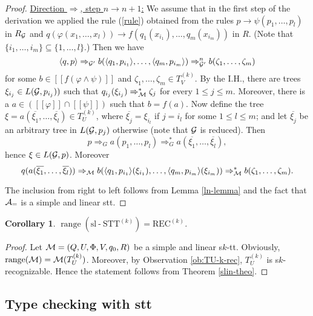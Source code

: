 \documentclass[10pt]{scrartcl}
\newtheorem{cor}[df]{Corollary}
\newcommand{\seml}{[\![}
\newcommand{\semr}{]\!]}
\newcommand{\REC}{\mathrm{REC}}
\newcommand{\slSTT}{\mathrm{sl}\n\mathrm{STT}}
\newcommand{\A}{{\cal A}}
\newcommand{\M}{{\cal M}}
\newcommand{\G}{{\cal G}}
\DeclareMathOperator{\range}{range}
\DeclareMathOperator{\n}{-}
\def\ui#1{^{(#1)}}
\begin{document}
\begin{proof}
\underline{Direction $\Rightarrow$, step $n\to n+1$:} We assume that in the first step of the derivation we applied the rule (\ref{rule}) obtained from the rules
$p \to \psi(p_1,\ldots,p_l)$ in $R_\G$ and $q(\varphi(x_1,\ldots,x_l))\to f(q_1(x_{i_1}),\ldots,q_m(x_{i_m}))$  in $R$. (Note that $\{i_1,\ldots,i_m\} \subseteq \{1,\ldots,l\}$.) Then we have
$$\langle q,p\rangle \Rightarrow_{\G'} b(\langle q_1,p_{i_1}\rangle,\ldots,\langle q_m,p_{i_m}\rangle)  \Rightarrow_{\G'}^n b(\zeta_1,\ldots,\zeta_m)$$
for some $b\in \seml f(\varphi\wedge \psi)\semr$ and $\zeta_1,\ldots,\zeta_m \in T_V\ui k$. By the I.H., there are trees  $\xi_{i_j} \in  L(\G,p_{i_j}))$
such that $q_{i_j}(\xi_{i_j}) \Rightarrow_\M^* \zeta_j$ for every $1\le j\le m$. Moreover, there is a $a\in (\seml \varphi\semr \cap \seml \psi\semr)$ such that $b=f(a)$. Now define the tree $\xi=a(\overline{\xi_1},\ldots,\overline{\xi_l})\in T_U\ui k$, where $\overline{\xi_j}=\xi_{i_l}$ if $j=i_l$ for some $1\le l\le m$; and let $\overline{\xi_j}$ be an arbitrary tree in $L(\G,p_j)$ otherwise (note that $\G$ is reduced). Then 
$$p\Rightarrow_G a(p_1,\ldots,p_l) \Rightarrow_G^* a(\overline{\xi_1},\ldots,\overline{\xi_l}),$$
hence $\xi \in  L(\G,p)$.  Moreover
$$q(a(\overline{\xi_1},\ldots,\overline{\xi_l}))\Rightarrow_\M b(\langle q_1,p_{i_1}\rangle (\xi_{i_1}),\ldots,\langle q_m,p_{i_m}\rangle (\xi_{i_m}))\Rightarrow_\M^* b(\zeta_1,\ldots,\zeta_m).$$


The inclusion from right to left follows from Lemma \ref{ln-lemma} and the fact that $\A_{=}$ is a simple and linear stt.
\end{proof}

\begin{cor} \rm \label{range-lemma}$\range(\slSTT\ui k)=\REC\ui k$.
\end{cor}
\begin{proof}  Let $\M = (Q,U,\Phi,V,q_0,R)$ be a simple and linear s$k$-tt. Obviously, $\range(\M)=\M(T_U\ui k)$. Moreover, by Observation \ref{ob:TU-k-rec}, $T_U\ui k$ is s$k$-recognizable. Hence the statement follows from Theorem \ref{slin-theo}.
\end{proof}

\subsection{Type checking with stt}
\end{document}
